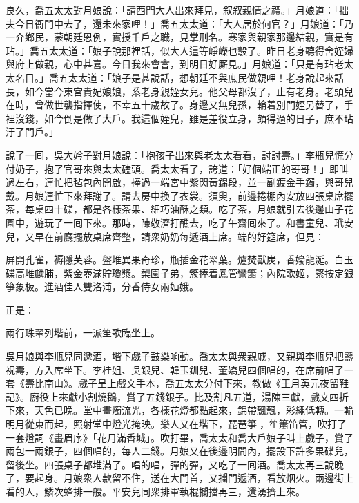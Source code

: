 良久，喬五太太對月娘說：「請西門大人出來拜見，叙叙親情之禮。」月娘道：「拙夫今日衙門中去了，還未來家哩！」喬五太太道：「大人居於何官？」月娘道：「乃一介鄉民，蒙朝廷恩例，實授千戶之職，見掌刑名。寒家與親家那邊結親，實是有玷。」喬五太太道：「娘子說那裡話，似大人這等崢嶸也彀了。昨日老身聽得舍姪婦與府上做親，心中甚喜。今日我來會會，到明日好厮見。」月娘道：「只是有玷老太太名目。」喬五太太道：「娘子是甚說話，想朝廷不與庶民做親哩！老身說起來話長，如今當今東宮貴妃娘娘，系老身親姪女兒。他父母都沒了，止有老身。老頭兒在時，曾做世襲指揮使，不幸五十歲故了。身邊又無兒孫，輪着別門姪另替了，手裡沒錢，如今倒是做了大戶。我這個姪兒，雖是差役立身，頗得過的日子，庶不玷汙了門戶。」

說了一囘，吳大妗子對月娘說：「抱孩子出來與老太太看看，討討壽。」李瓶兒慌分付奶子，抱了官哥來與太太磕頭。喬太太看了，誇道：「好個端正的哥哥！」即叫過左右，連忙把毡包內開啟，捧過一端宮中紫閃黃錦段，並一副鍍金手鐲，與哥兒戴。月娘連忙下來拜謝了。請去房中換了衣裳。須臾，前邊捲棚內安放四張桌席擺茶，每桌四十碟，都是各樣茶果、細巧油酥之類。吃了茶，月娘就引去後邊山子花園中，遊玩了一囘下來。那時，陳敬濟打醮去，吃了午齋囘來了。和書童兒、玳安兒，又早在前廳擺放桌席齊整，請衆奶奶每遞酒上席。端的好筵席，但見：

\begin{myquote}
屏開孔雀，褥隱芙蓉。盤堆異果奇珍，瓶插金花翠葉。爐焚獸炭，香嬝龍涎。白玉碟高堆麟脯，紫金壺滿貯瓊漿。梨園子弟，簇捧着鳳管鸞簫；內院歌姬，緊按定銀箏象板。進酒佳人雙洛浦，分香侍女兩姮娥。
\end{myquote}

正是：

\begin{myquote}
兩行珠翠列堦前，一派笙歌臨坐上。
\end{myquote}

吳月娘與李瓶兒同遞酒，堦下戲子鼓樂响動。喬太太與衆親戚，又親與李瓶兒把盞祝壽，方入席坐下。李桂姐、吳銀兒、韓玉釧兒、董嬌兒四個唱的，在席前唱了一套《壽比南山》。戲子呈上戲文手本，喬五太太分付下來，教做《王月英元夜留鞋記》。{}廚役上來獻小割燒鵝，賞了五錢銀子。比及割凡五道，湯陳三獻，戲文四折下來，天色已晚。堂中畫燭流光，各樣花燈都點起來，錦帶飄飄，彩繩低轉。一輪明月從東而起，照射堂中燈光掩映。樂人又在堦下，琵琶箏𥱧，笙簫笛管，吹打了一套燈詞《畫眉序》「花月滿香城」。吹打畢，喬太太和喬大戶娘子叫上戲子，賞了兩包一兩銀子，四個唱的，每人二錢。月娘又在後邊明間內，擺設下許多果碟兒，留後坐。四張桌子都堆滿了。唱的唱，彈的彈，又吃了一囘酒。喬太太再三說晚了，要起身。月娘衆人款留不住，送在大門首，又攔門遞酒，看放烟火。兩邊街上看的人，鱗次蜂排一般。平安兒同衆排軍執棍攔擋再三，還湧擠上來。

